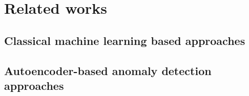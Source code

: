 \chapter{Related works}
\label{chap:related works}


\section{Classical machine learning based approaches}
\label{sec:Classical machine learning based approaches}




\section{Autoencoder-based anomaly detection approaches}
\label{sec:Autoencoder-based anomaly detection approaches}






